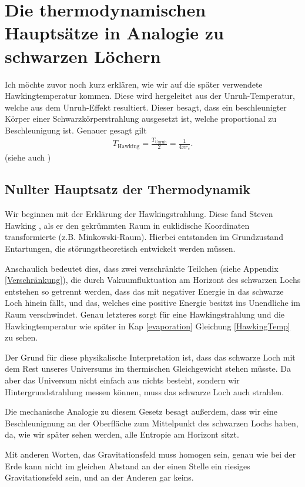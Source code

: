 \documentclass[ngerman]{scrartcl}
\begin{document}
\section{Die thermodynamischen Hauptsätze in Analogie zu schwarzen Löchern}
Ich möchte zuvor noch kurz erklären, wie wir auf die später verwendete Hawkingtemperatur kommen. Diese wird hergeleitet aus der Unruh-Temperatur, welche aus dem Unruh-Effekt resultiert. Dieser besagt, dass ein beschleunigter Körper einer Schwarzkörperstrahlung ausgesetzt ist, welche proportional zu Beschleunigung ist. 
Genauer gesagt gilt
	\begin{align}
		T_{\mathrm{Hawking}} = \frac{T_{\mathrm{Unruh}}}{2} = \frac{1}{4 \pi r_s}.
	\end{align}
(siehe auch \cite{JerusalemsLectures})

	\subsection{Nullter Hauptsatz der Thermodynamik}
	Wir beginnen mit der Erklärung der Hawkingstrahlung. Diese fand Steven Hawking \cite{ParticleCreation}, als er den gekrümmten Raum in euklidische Koordinaten transformierte (z.B. Minkowski-Raum). Hierbei entstanden im Grundzustand Entartungen, die störungstheoretisch entwickelt werden müssen. 
	
	Anschaulich bedeutet dies, dass zwei verschränkte Teilchen (siehe Appendix \ref{Verschränkung}), die durch Vakuumfluktuation am Horizont des schwarzen Lochs entstehen so getrennt werden, dass das mit negativer Energie in das schwarze Loch hinein fällt, und das, welches eine positive Energie besitzt ins Unendliche im Raum verschwindet. 
	Genau letzteres sorgt für eine Hawkingstrahlung und die Hawkingtemperatur wie später in Kap \ref{evaporation} Gleichung \eqref{HawkingTemp} zu sehen.
	
	Der Grund für diese physikalische Interpretation ist, dass das schwarze Loch mit dem Rest unseres Universums im thermischen Gleichgewicht stehen müsste. Da aber das Universum nicht einfach aus nichts besteht, sondern wir Hintergrundstrahlung messen können, muss das schwarze Loch auch strahlen. 
	
	Die mechanische Analogie zu diesem Gesetz besagt außerdem, dass wir eine Beschleunignung an der Oberfläche zum Mittelpunkt des schwarzen Lochs haben, da, wie wir später sehen werden, alle Entropie am Horizont sitzt.
	
	Mit anderen Worten, das Gravitationsfeld muss homogen sein, genau wie bei der Erde kann nicht im gleichen Abstand an der einen Stelle ein riesiges Gravitationsfeld sein, und an der Anderen gar keins.
\end{document}
